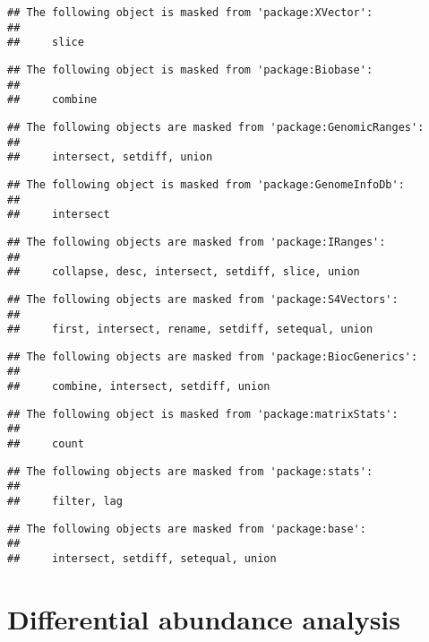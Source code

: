 \documentclass[
  oneside]{book}
\begin{document}
\begin{verbatim}
## The following object is masked from 'package:XVector':
## 
##     slice
\end{verbatim}

\begin{verbatim}
## The following object is masked from 'package:Biobase':
## 
##     combine
\end{verbatim}

\begin{verbatim}
## The following objects are masked from 'package:GenomicRanges':
## 
##     intersect, setdiff, union
\end{verbatim}

\begin{verbatim}
## The following object is masked from 'package:GenomeInfoDb':
## 
##     intersect
\end{verbatim}

\begin{verbatim}
## The following objects are masked from 'package:IRanges':
## 
##     collapse, desc, intersect, setdiff, slice, union
\end{verbatim}

\begin{verbatim}
## The following objects are masked from 'package:S4Vectors':
## 
##     first, intersect, rename, setdiff, setequal, union
\end{verbatim}

\begin{verbatim}
## The following objects are masked from 'package:BiocGenerics':
## 
##     combine, intersect, setdiff, union
\end{verbatim}

\begin{verbatim}
## The following object is masked from 'package:matrixStats':
## 
##     count
\end{verbatim}

\begin{verbatim}
## The following objects are masked from 'package:stats':
## 
##     filter, lag
\end{verbatim}

\begin{verbatim}
## The following objects are masked from 'package:base':
## 
##     intersect, setdiff, setequal, union
\end{verbatim}

\hypertarget{differential-abundance-analysis}{%
\chapter{Differential abundance analysis}\label{differential-abundance-analysis}}
\end{document}
